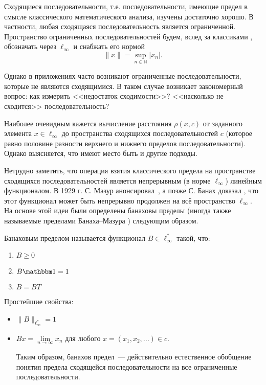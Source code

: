 Сходящиеся последовательности, т.е. последовательности, имеющие предел в смысле классического математического анализа,
изучены достаточно хорошо.
В частности, любая сходящаяся последовательность является ограниченной.
Пространство ограниченных последовательностей будем, вслед за классиками \cite{wojtaszczyk1996banach,lindenstrauss1973classical},
обозначать через $\ell_\infty$ и снабжать его нормой
\begin{equation*}
	\|x\| = \sup_{n\in\mathbb{N}}|x_n|
	.
\end{equation*}

Однако в приложениях часто возникают ограниченные последовательности,
которые не являются сходящимися.
В таком случае возникает закономерный вопрос:
как измерить <<недостаток сходимости>>?
<<насколько не сходится>> последовательность?

Наиболее очевидным кажется вычисление расстояния $\rho(x,c)$ от заданного элемента $x\in\ell_\infty$
до пространства сходящихся последовательностей $c$
(которое равно половине разности верхнего и нижнего пределов последовательности).
Однако выясняется, что имеют место быть и другие подходы.

Нетрудно заметить, что операция взятия классического предела на пространстве сходящихся последовательностей
является непрерывным (в норме $\ell_\infty$) линейным функционалом.
В 1929 г. С. Мазур анонсировал~\cite{Mazur}, а позже
С. Банах доказал \cite{banach2001theory_rus}, что этот функционал может быть непрерывно продолжен на всё пространство $\ell_\infty$.
На основе этой идеи были определены банаховы пределы
(иногда также называемые пределами Банаха--Мазура \cite{alekhno2012superposition,alekhno2015banach})
следующим образом.

Банаховым пределом называется функционал $B\in \ell_\infty^*$ такой, что:
\begin{enumerate}
	\item
		$B \geqslant 0$
	\item
		$B\one = 1$
	\item
		$B=BT$
\end{enumerate}

Простейшие свойства:
\begin{itemize}
	\item
		$\|B\|_{\ell_\infty^*} = 1$
	\item
		$Bx = \lim\limits_{n\to\infty} x_n$ для любого $x=(x_1, x_2, ...) \in c$.

		Таким образом,
		банахов предел~--- действительно естественное обобщение понятия предела сходящейся последовательности
		на все ограниченные последовательности.
\end{itemize}

